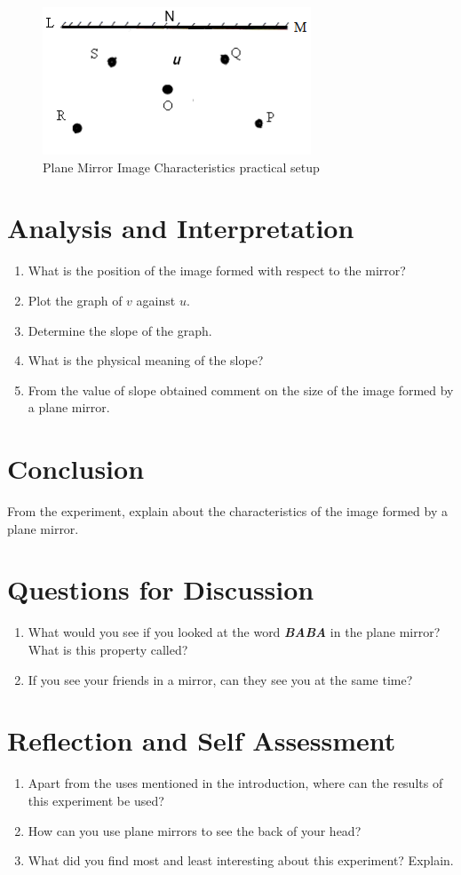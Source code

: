 \begin{figure}[h!]
\centering
\includegraphics[width=8cm]{./img/plane-mirror-1.png}
\caption{Plane Mirror Image Characteristics practical setup}
\label{fig:plane-mirror-1}
\end{figure}

\section{Analysis and Interpretation}
\begin{enumerate}
\item What is the position of the image formed with respect to the mirror?
\item Plot the graph of $v$ against $u$. 
\item Determine the slope of the graph.
\item What is the physical meaning of the slope?
\item From the value of slope obtained comment on the size of the image formed by a plane mirror.
\end{enumerate}

\section{Conclusion}
From the experiment, explain about the characteristics of the image formed by a plane mirror.

\section{Questions for Discussion}
\begin{enumerate}
\item What would you see if you looked at the word \emph{\textbf{BABA}} in the plane mirror? What is this property called? 
\item If you see your friends in a mirror, can they see you at the same time?
\end{enumerate}

\section{Reflection and Self Assessment}
\begin{enumerate}
\item Apart from the uses mentioned in the introduction, where can the results of this experiment be used?
\item How can you use plane mirrors to see the back of your head?
\item What did you find most and least interesting about this experiment? Explain.
\end{enumerate}
